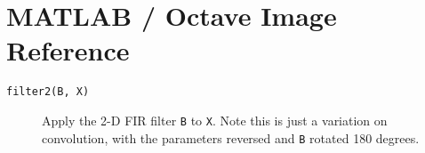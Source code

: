 \twocolumn

\section{MATLAB / Octave Image Reference}

\begin{description}
	\item[\texttt{filter2(B, X)}]
		Apply the 2-D FIR filter \texttt{B} to \texttt{X}. Note this is just a variation on convolution, with the parameters reversed and \texttt{B} rotated 180 degrees.
\end{description}